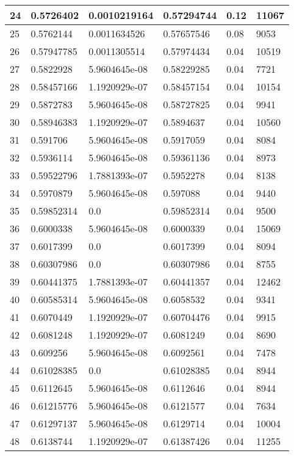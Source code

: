 \begin{longtable}{|l|l|l|l|l|l|}
24 & 0.5726402 & 0.0010219164 & 0.57294744 & 0.12 & 11067 \\ \hline 
25 & 0.5762144 & 0.0011634526 & 0.57657546 & 0.08 & 9053 \\ \hline 
26 & 0.57947785 & 0.0011305514 & 0.57974434 & 0.04 & 10519 \\ \hline 
27 & 0.5822928 & 5.9604645e-08 & 0.58229285 & 0.04 & 7721 \\ \hline 
28 & 0.58457166 & 1.1920929e-07 & 0.58457154 & 0.04 & 10154 \\ \hline 
29 & 0.5872783 & 5.9604645e-08 & 0.58727825 & 0.04 & 9941 \\ \hline 
30 & 0.58946383 & 1.1920929e-07 & 0.5894637 & 0.04 & 10560 \\ \hline 
31 & 0.591706 & 5.9604645e-08 & 0.5917059 & 0.04 & 8084 \\ \hline 
32 & 0.5936114 & 5.9604645e-08 & 0.59361136 & 0.04 & 8973 \\ \hline 
33 & 0.59522796 & 1.7881393e-07 & 0.5952278 & 0.04 & 8138 \\ \hline 
34 & 0.5970879 & 5.9604645e-08 & 0.597088 & 0.04 & 9440 \\ \hline 
35 & 0.59852314 & 0.0 & 0.59852314 & 0.04 & 9500 \\ \hline 
36 & 0.6000338 & 5.9604645e-08 & 0.6000339 & 0.04 & 15069 \\ \hline 
37 & 0.6017399 & 0.0 & 0.6017399 & 0.04 & 8094 \\ \hline 
38 & 0.60307986 & 0.0 & 0.60307986 & 0.04 & 8755 \\ \hline 
39 & 0.60441375 & 1.7881393e-07 & 0.60441357 & 0.04 & 12462 \\ \hline 
40 & 0.60585314 & 5.9604645e-08 & 0.6058532 & 0.04 & 9341 \\ \hline 
41 & 0.6070449 & 1.1920929e-07 & 0.60704476 & 0.04 & 9915 \\ \hline 
42 & 0.6081248 & 1.1920929e-07 & 0.6081249 & 0.04 & 8690 \\ \hline 
43 & 0.609256 & 5.9604645e-08 & 0.6092561 & 0.04 & 7478 \\ \hline 
44 & 0.61028385 & 0.0 & 0.61028385 & 0.04 & 8944 \\ \hline 
45 & 0.6112645 & 5.9604645e-08 & 0.6112646 & 0.04 & 8944 \\ \hline 
46 & 0.61215776 & 5.9604645e-08 & 0.6121577 & 0.04 & 7634 \\ \hline 
47 & 0.61297137 & 5.9604645e-08 & 0.6129714 & 0.04 & 10004 \\ \hline 
48 & 0.6138744 & 1.1920929e-07 & 0.61387426 & 0.04 & 11255 \\ \hline 

\end{longtable}
